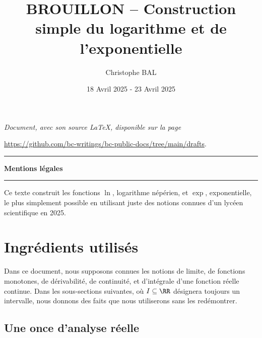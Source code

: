 \documentclass[12pt]{amsart}
\begin{document}
\title{BROUILLON -- Construction simple du logarithme et de l'exponentielle}
\author{Christophe BAL}
\date{18 Avril 2025 - 23 Avril 2025}

\maketitle

\begin{center}
	\itshape
	Document, avec son source \LaTeX, disponible sur la page

	\url{https://github.com/bc-writings/bc-public-docs/tree/main/drafts}.
\end{center}


\bigskip


\begin{center}
	\hrule\vspace{.3em}
	{
		\fontsize{1.35em}{1em}\selectfont
		\textbf{Mentions \og légales \fg}
	}

	\vspace{0.45em}
	\doclicenseThis
	\hrule
\end{center}


\bigskip


\setcounter{tocdepth}{2}
\tableofcontents




\newpage

\begin{meta-abstract*}
	Ce texte construit les fonctions $\ln$, logarithme népérien, et $\exp$, exponentielle, le plus simplement possible en utilisant juste des notions connues d'un lycéen scientifique en 2025.
\end{meta-abstract*}




\section{Ingrédients utilisés}

Dans ce document,
nous supposons connues les notions
de limite,
de fonctions monotones,
de dérivabilité,
de continuité,
et
d'intégrale d'une fonction réelle continue.
%
Dans les sous-sections suivantes, où $I \subseteq \RR$ désignera toujours un intervalle, nous donnons des faits que nous utiliserons sans les redémontrer.


	\subsection{Une once d'analyse réelle}
\end{document}
